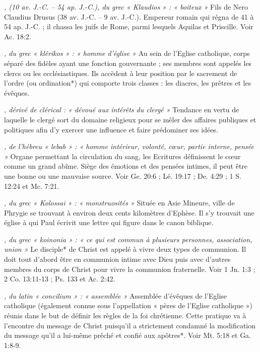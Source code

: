 \begin{multicols}{2}
{\textit{, (10 av. J.-C. – 54 ap. J.-C.), du grec « Klaudios » : « boiteux »}\newline
Fils de Nero Claudius Drusus (38 av. J.-C. – 9 av. J.-C.). Empereur romain qui régna de 41 à 54 ap. J.-C. ; il chassa les juifs de Rome, parmi lesquels Aquilas et Priscille. Voir Ac. 18:2.

\textit{, du grec « klêrikos » : « homme d'église »}\newline
Au sein de l'Eglise catholique, corps séparé des fidèles ayant une fonction gouvernante ; ses membres sont appelés les clercs ou les ecclésiastiques. Ils accèdent à leur position par le sacrement de l'ordre (ou ordination*) qui comporte trois classes : les diacres, les prêtres et les évêques.

\textit{, dérivé de clérical : « dévoué aux intérêts du clergé »}\newline
Tendance en vertu de laquelle le clergé sort du domaine religieux pour se mêler des affaires publiques et politiques afin d'y exercer une influence et faire prédominer ses idées.

\textit{, de l'hébreu « lebab » : « homme intérieur, volonté, cœur, partie interne, pensée »}\newline
Organe permettant la circulation du sang, les Ecritures définissent le cœur comme un grand abîme. Siège des émotions et des pensées intimes, il peut être une bonne ou une mauvaise source. Voir Ge. 20:6 ; Lé. 19:17 ; De. 4:29 ; 1 S. 12:24 et Mc. 7:21.

\textit{, du grec « Kolossai » : « monstruosités »}\newline
Située en Asie Mineure, ville de Phrygie se trouvant à environ deux cents kilomètres d'Ephèse. Il s'y trouvait une église à qui Paul écrivit une lettre qui figure dans le canon biblique.

\textit{, du grec « koinonia » : « ce qui est commun à plusieurs personnes, association, union »}\newline
Le disciple* de Christ est appelé à vivre deux types de communion. Il doit tout d'abord être en communion intime avec Dieu puis avec d'autres membres du corps de Christ pour vivre la communion fraternelle. Voir 1 Jn. 1:3 ; 2 Co. 13:11-13 ; Ps. 133 et Ac. 2:42.

\textit{, du latin « concilium » : « assemblée »}\newline
Assemblée d'évêques de l'Eglise catholique (également connue sous l'appellation « pères de l'Eglise catholique ») réunis dans le but de définir les règles de la foi chrétienne. Cette pratique va à l'encontre du message de Christ puisqu'il a strictement condamné la modification du message qu'il a lui-même prêché et confié aux apôtres*. Voir Mt. 5:18 et Ga. 1:8-9.

}
\end{multicols}

